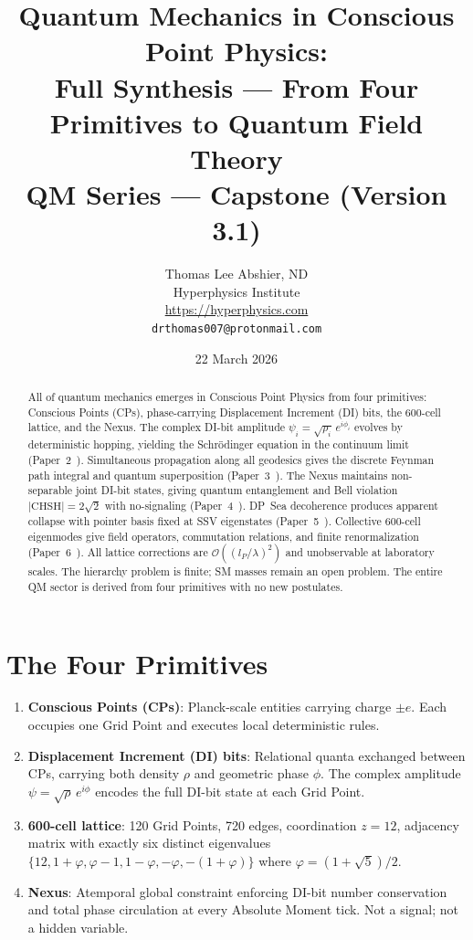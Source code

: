\documentclass[11pt,a4paper]{article}
\title{\textbf{Quantum Mechanics in Conscious Point Physics:\\
Full Synthesis --- From Four Primitives to Quantum Field Theory}\\[6pt]
{\large QM Series --- Capstone (Version 3.1)}}
\author{Thomas Lee Abshier, ND\\
Hyperphysics Institute\\
\url{https://hyperphysics.com}\\
\texttt{drthomas007@protonmail.com}}
\date{22 March 2026}
\newcommand{\lP}{l_P}
\begin{document}
\maketitle

\begin{abstract}
All of quantum mechanics emerges in Conscious Point Physics from four
primitives: Conscious Points (CPs), phase-carrying Displacement
Increment (DI) bits, the 600-cell lattice, and the Nexus.  The
complex DI-bit amplitude $\psi_i = \sqrt{\rho_i}\,e^{i\phi_i}$
evolves by deterministic hopping, yielding the Schr\"{o}dinger
equation in the continuum limit (Paper~2~\cite{cpp2040a}).
Simultaneous propagation along all geodesics gives the discrete
Feynman path integral and quantum superposition
(Paper~3~\cite{cpp2040b_super}).  The Nexus maintains non-separable
joint DI-bit states, giving quantum entanglement and Bell violation
$|\mathrm{CHSH}|=2\sqrt{2}$ with no-signaling
(Paper~4~\cite{cpp2040c}).  DP~Sea decoherence produces apparent
collapse with pointer basis fixed at SSV eigenstates
(Paper~5~\cite{cpp2040d}).  Collective 600-cell eigenmodes give field
operators, commutation relations, and finite renormalization
(Paper~6~\cite{cpp2040e}).  All lattice corrections are
$\mathcal{O}((\lP/\lambda)^2)$ and unobservable at laboratory scales.
The hierarchy problem is finite; SM masses remain an open problem.
The entire QM sector is derived from four primitives with no new
postulates.
\end{abstract}

\tableofcontents
\newpage

\section{The Four Primitives}

\begin{enumerate}
\item \textbf{Conscious Points (CPs)}: Planck-scale entities carrying
  charge $\pm e$.  Each occupies one Grid Point and executes local
  deterministic rules.

\item \textbf{Displacement Increment (DI) bits}: Relational quanta
  exchanged between CPs, carrying both density $\rho$ and geometric
  phase $\phi$.  The complex amplitude $\psi = \sqrt{\rho}\,e^{i\phi}$
  encodes the full DI-bit state at each Grid Point.

\item \textbf{600-cell lattice}: 120 Grid Points, 720 edges,
  coordination $z=12$, adjacency matrix with exactly six distinct
  eigenvalues $\{12, 1+\varphi, \varphi-1, 1-\varphi, -\varphi,
  -(1+\varphi)\}$ where $\varphi = (1+\sqrt5)/2$.

\item \textbf{Nexus}: Atemporal global constraint enforcing DI-bit
  number conservation and total phase circulation at every Absolute
  Moment tick.  Not a signal; not a hidden variable.
\end{enumerate}
\end{document}
